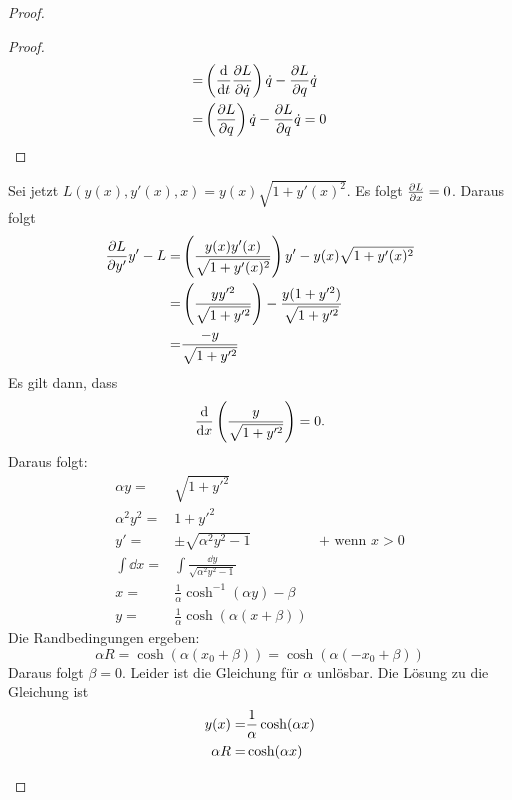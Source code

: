 \begin{proof}
\begin{enumerate}
\begin{proof}
\begin{align*}
	=&\left( \dv{t}\pdv{L}{\dot{q}} \right) \dot{q}-\pdv{L}{q}\dot{q}\\
	=&\left( \pdv{L}{q} \right) \dot{q}-\pdv{L}{q}	\dot{q}=0\qedhere
	\end{align*}
			\end{proof}
			Sei jetzt $L(y(x),y'(x),x)=y(x)\sqrt{1+y'(x)^2} $. Es folgt $\pdv{L}{x}=0$. Daraus folgt
			\begin{align*}
				\pdv{L}{y'}y'-L=&\left( \frac{y(x)y'(x)}{\sqrt{1+y'(x)^2} } \right) y'-y(x)\sqrt{1+y'(x)^2}\\
				=&\left( \frac{yy'^2}{\sqrt{1+y'^2} } \right) -\frac{y(1+y'^2)}{\sqrt{1+y'^2} }\\
				=&\frac{-y}{\sqrt{1+y'^2} }
			\end{align*}
			Es gilt dann, dass
			\[
				\dv{x}\left( \frac{y}{\sqrt{1+y'^2} } \right) =0
			.\] 
			Daraus folgt:
			\begin{align*}
				\alpha y=&\sqrt{1+y'^2} \\
				\alpha^2 y^2=& 1+y'^2\\
				y'=&\pm \sqrt{\alpha^2y^2-1} & +\text{ wenn }x>0\\
				\int\dd{x}=&	\int \frac{\dd y}{\sqrt{\alpha^2y^2-1} }\\
				x=&\frac{1}{\alpha}\cosh^{-1}\left( \alpha y \right)-\beta\\
				y=&\frac{1}{\alpha}\cosh(\alpha(x+\beta))
			\end{align*}
			Die Randbedingungen ergeben:
				\[\alpha R=\cosh\left( \alpha(x_0+\beta) \right) =\cosh\left( \alpha(-x_0+\beta) \right) 
				\]
				Daraus folgt $\beta=0$. Leider ist die Gleichung f\"{u}r $\alpha$ unl\"{o}sbar. Die L\"{o}sung zu die Gleichung ist
				\begin{align*}
					y(x)=&\frac{1}{\alpha}\cosh(\alpha x)\\
					\alpha R=&\cosh(\alpha x)\qedhere
				\end{align*}
	\end{enumerate}
\end{proof}
